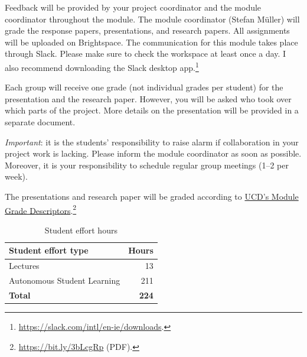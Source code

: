 \documentclass[abstract=on,parskip=full,headings=standardclasses,fontsize=11pt,paper=a4]{scrartcl}
\begin{document}
Feedback will be provided by your project coordinator and the module coordinator  throughout the module. The module coordinator (Stefan Müller) will grade the response papers, presentations, and research papers. All assignments will be uploaded on Brightspace.  The communication for this module takes place through Slack. Please make sure to check the workspace at least once a day. I also recommend downloading the Slack desktop app.\footnote{\url{https://slack.com/intl/en-ie/downloads}.}


Each group will receive one grade (not individual grades per student) for the presentation and the research paper. However, you will be asked who took over which parts of the project.  More details on the presentation will be provided in a separate document. 

\textit{Important}: it is the students' responsibility to raise alarm if collaboration in your project work is lacking. Please inform the module coordinator as soon as possible. Moreover, it is your responsibility to schedule regular group meetings (1--2 per week).

The presentations and research paper will be graded according to \href{https://bit.ly/3bLcgRp}{UCD's Module Grade Descriptors}.\footnote{\url{https://bit.ly/3bLcgRp} (PDF).}

\begin{table}[h] \centering \onehalfspacing
\caption*{Student effort hours}
\begin{tabular}{ l r} 
\toprule
Student effort type &  Hours \\
\midrule
Lectures & 13 \\
Autonomous Student Learning  & 211 \\
\textbf{Total} & \textbf{224} \\
\bottomrule
\end{tabular}
\end{table}
\end{document}
